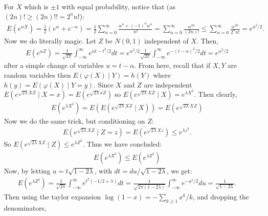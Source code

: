 \documentclass[12pt]{article}
\def \cph{\varphi}
\begin{document}
\begin{enumerate}[label=(\alph*)]
        For $X$ which is $\pm 1$ with equal probability, notice that (as $(2n)! \geq (2n)!! = 2^n n!$):
        \begin{align*}
            E(e^{\alpha X}) = \frac 12 (e^{\alpha} + e^{-\alpha}) = \frac 12 \sum_{n=0}^\infty \frac{\alpha^n + (-1)^n\alpha^n}{n!} = \sum_{n=0}^\infty \frac{\alpha^{2n}}{(2n)!} \leq \sum_{n=0}^\infty \frac{\alpha^{2n}}{2^n n!} = e^{\alpha^2/2}.
        \end{align*}
        Now we do literally magic. Let $Z$ be $N(0,1)$ independent of $X$. Then,
        \begin{align*}
            E(e^{\alpha Z}) = \frac{1}{\sqrt{2\pi}}\int_{-\infty}^\infty e^{\alpha t - t^2/2}dt = e^{\alpha^2/2} \frac{1}{\sqrt{2\pi}} \int_{-\infty}^{\infty} e^{-(t-\alpha)^2/2}dt = e^{\alpha^2/2}
        \end{align*}
        after a simple change of variables $u = t-\alpha$. From here, recall that if $X,Y$ are random variables then $E(\cph(X) \mid Y) = h(Y)$ where $h(y) = E(\cph(X) \mid Y = y)$. Since $X$ and $Z$ are independent $E(e^{\sqrt{2\lambda}XZ} \mid X = x) = E(e^{\sqrt{2\lambda} x Z})$ so $E(e^{\sqrt{2 \lambda } X Z} \mid X) = e^{\lambda X^2}$. Then clearly,
        \begin{align*}
            E(e^{\lambda X^2}) = E(E(e^{\sqrt{2 \lambda } X Z} \mid X)) = E(e^{\sqrt{2\lambda}XZ})
        \end{align*}
        Now we do the same trick, but conditioning on $Z$:
        \begin{align*}
            E(e^{\sqrt{2\lambda} XZ} \mid Z = z) = E(e^{\sqrt{2\lambda} X z}) \leq e^{\lambda z^2}.
        \end{align*}
        So $E(e^{\sqrt{2\lambda}XZ} \mid Z) \leq e^{\lambda Z^2}$. Thus we have concluded:
        \begin{align*}
            E(e^{\lambda X^2}) \leq E(e^{\lambda Z^2})
        \end{align*}
        Now, by letting $u = t\sqrt{1 - 2\lambda}$, with $dt = du/\sqrt{1-2\lambda}$, we get:
        \begin{align*}
            E(e^{\lambda Z^2}) = \frac{1}{\sqrt{2\pi}} \int_{-\infty}^{\infty} e^{t^2(-1/2 + \lambda)}dt = \frac{1}{\sqrt{2\pi(1-2\lambda)}}\int_{-\infty}^\infty e^{-u^2/2}du = \frac{1}{\sqrt{1 - 2\lambda}}.
        \end{align*}
        Then using the taylor expansion $\log(1-x) = -\sum_{k \geq 1} x^k/k$, and dropping the denominators,
        \begin{align*}

\end{align*}
\end{enumerate}
\end{document}
